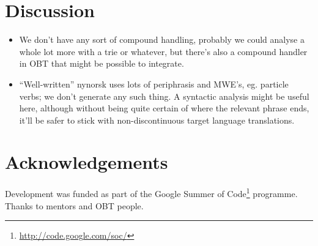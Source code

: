 \documentclass[11pt]{article}
\begin{document}
\section{Discussion}
\label{sec-5}

\begin{itemize}
\item We don't have any sort of compound handling, probably we could
  analyse a whole lot more with a trie or whatever, but there's also a
  compound handler in OBT that might be possible to integrate.
\item ``Well-written'' nynorsk uses lots of periphrasis and MWE's, eg. particle
  verbs; we don't generate any such thing. A syntactic analysis might
  be useful here, although without being quite certain of where the
  relevant phrase ends, it'll be safer to stick with non-discontinuous
  target language translations.
\end{itemize}
\section{Acknowledgements}
\label{sec-6}

Development was funded as part of the Google Summer of Code\footnote{\href{http://code.google.com/soc/}{http://code.google.com/soc/} }
programme. Thanks to mentors and OBT people.



\end{document}
